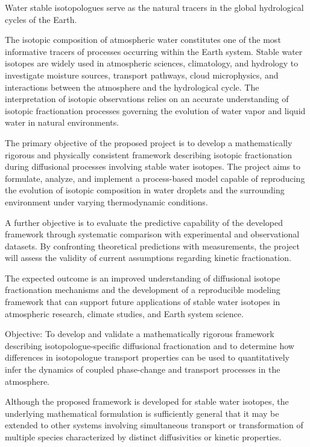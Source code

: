 \documentclass[11pt,a4paper]{article}
\begin{document}
Water stable isotopologues serve as the natural tracers in the global hydrological
cycles of the Earth.

The isotopic composition of atmospheric water constitutes one of the most informative
tracers of processes occurring within the Earth system.
Stable water isotopes are widely used in atmospheric sciences, climatology, and hydrology
to investigate moisture sources, transport pathways, cloud microphysics,
and interactions between the atmosphere and the hydrological cycle.
The interpretation of isotopic observations relies on an accurate understanding
of isotopic fractionation processes governing the evolution of water vapor
and liquid water in natural environments.

The primary objective of the proposed project is to develop a mathematically rigorous
and physically consistent
framework describing isotopic fractionation during diffusional processes
involving stable water isotopes.
The project aims to formulate, analyze, and implement a process-based model capable
of reproducing
the evolution of isotopic composition in water droplets and the surrounding environment under
varying thermodynamic conditions.

A further objective is to evaluate the predictive capability
of the developed framework through systematic
comparison with experimental and observational datasets.
By confronting theoretical predictions with measurements, the project will assess the validity
of current assumptions regarding kinetic fractionation.

The expected outcome is an improved understanding of diffusional isotope fractionation mechanisms
and the development of a reproducible modeling framework that can support future applications of
stable water isotopes in atmospheric research, climate studies, and Earth system science.

Objective:
To develop and validate a mathematically rigorous framework describing isotopologue-specific diffusional
fractionation and to determine how differences in isotopologue transport properties can be used to quantitatively
infer the dynamics of coupled phase-change and transport processes in the atmosphere.

Although the proposed framework is developed for stable water isotopes, the underlying mathematical
formulation is sufficiently general that it may be extended to other systems involving simultaneous
transport or transformation of multiple species characterized by distinct diffusivities or kinetic properties.
\end{document}
